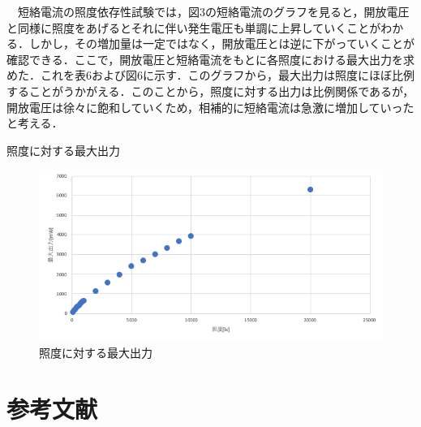 　短絡電流の照度依存性試験では，図3の短絡電流のグラフを見ると，開放電圧と同様に照度をあげるとそれに伴い発生電圧も単調に上昇していくことがわかる．しかし，その増加量は一定ではなく，開放電圧とは逆に下がっていくことが確認できる．ここで，開放電圧と短絡電流をもとに各照度における最大出力を求めた．これを表6および図6に示す．このグラフから，最大出力は照度にほぼ比例することがうかがえる．このことから，照度に対する出力は比例関係であるが，開放電圧は徐々に飽和していくため，相補的に短絡電流は急激に増加していったと考える．\\

\newpage
\begin{table}[htbp]
  \centering
  \caption{照度に対する最大出力}
  
\end{table}

\begin{figure}[H]
  \centering
  \includegraphics[width=15cm]{./fig/fig06.png}
  \caption{照度に対する最大出力}
\end{figure}

\newpage
\section{参考文献}


